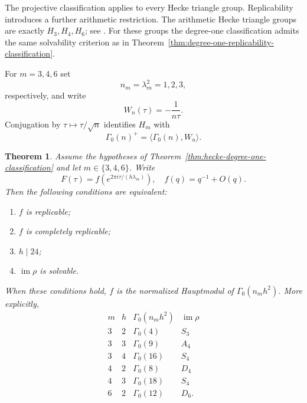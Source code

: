 \documentclass[11pt]{amsart}
\newtheorem{thm}{Theorem}[section]
\theoremstyle{definition}
\theoremstyle{remark}
\numberwithin{equation}{section}
\begin{document}
The projective classification applies to every Hecke triangle group. Replicability introduces a further arithmetic restriction. The arithmetic Hecke triangle groups are exactly $H_3,H_4,H_6$; see \cite{schmidt-smith}. For these groups the degree-one classification admits the same solvability criterion as in Theorem~\ref{thm:degree-one-replicability-classification}.

For $m=3,4,6$ set
\[
n_m=\lambda_m^2=1,2,3,
\]
respectively, and write
\[
W_n(\tau)=-\frac1{n\tau}.
\]
Conjugation by $\tau\mapsto\tau/\sqrt n$ identifies $H_m$ with
\[
\Gamma_0(n)^+=\langle\Gamma_0(n),W_n\rangle.
\]

\begin{thm}\label{thm:arithmetic-hecke-replicability}
Assume the hypotheses of Theorem~\ref{thm:hecke-degree-one-classification} and let $m\in\{3,4,6\}$. Write
\[
F(\tau)
=
f\!\left(e^{2\pi i\tau/(h\lambda_m)}\right),
\quad
f(q)=q^{-1}+O(q).
\]
Then the following conditions are equivalent:
\begin{enumerate}
\item $f$ is replicable;
\item $f$ is completely replicable;
\item $h\mid24$;
\item $\operatorname{im}\rho$ is solvable.
\end{enumerate}
When these conditions hold, $f$ is the normalized Hauptmodul of $\Gamma_0(n_mh^2)$. More explicitly,
\[
\begin{array}{c|c|c|c}
 m & h & \Gamma_0(n_mh^2) & \operatorname{im}\rho\\ \hline
 3&2&\Gamma_0(4)&S_3\\
 3&3&\Gamma_0(9)&A_4\\
 3&4&\Gamma_0(16)&S_4\\
 4&2&\Gamma_0(8)&D_4\\
 4&3&\Gamma_0(18)&S_4\\
 6&2&\Gamma_0(12)&D_6.
\end{array}
\]
\end{thm}
\end{document}
